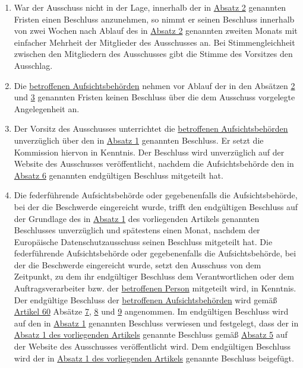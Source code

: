 \begin{enumerate}
  \item War der Ausschuss nicht in der Lage, innerhalb der in \hyperref[itm:65-2]{Absatz 2} genannten Fristen einen
   Beschluss anzunehmen, so nimmt er seinen Beschluss innerhalb von zwei Wochen nach Ablauf des in \hyperref[itm:65-2]
   {Absatz 2} genannten zweiten Monats mit einfacher Mehrheit der Mitglieder des Ausschusses an. Bei Stimmengleichheit
   zwischen den Mitgliedern des Ausschusses gibt die Stimme des Vorsitzes den Ausschlag.
  \label{itm:65-3}

  \item Die \hyperref[itm:04-22]{betroffenen Aufsichtsbehörden} nehmen vor Ablauf der in den Absätzen \hyperref[itm:65-2]{2} und \hyperref
   [itm:65-3]{3} genannten Fristen keinen Beschluss über die dem Ausschuss vorgelegte Angelegenheit an.
  \label{itm:65-4}

  \item Der Vorsitz des Ausschusses unterrichtet die \hyperref[itm:04-22]{betroffenen Aufsichtsbehörden} unverzüglich über den in \hyperref
   [itm:65-1]{Absatz 1} genannten Beschluss. Er setzt die Kommission hiervon in Kenntnis. Der Beschluss wird
   unverzüglich auf der Website des Ausschusses veröffentlicht, nachdem die Aufsichtsbehörde den in \hyperref[itm:65-6]
   {Absatz 6} genannten endgültigen Beschluss mitgeteilt hat.
  \label{itm:65-5}

  \item Die federführende Aufsichtsbehörde oder gegebenenfalls die Aufsichtsbehörde, bei der die Beschwerde eingereicht
   wurde, trifft den endgültigen Beschluss auf der Grundlage des in \hyperref[itm:65-1]{Absatz 1} des vorliegenden
   Artikels genannten Beschlusses unverzüglich und spätestens einen Monat, nachdem der Europäische Datenschutzausschuss
   seinen Beschluss mitgeteilt hat. Die federführende Aufsichtsbehörde oder gegebenenfalls die Aufsichtsbehörde, bei
   der die Beschwerde eingereicht wurde, setzt den Ausschuss von dem Zeitpunkt, zu dem ihr endgültiger Beschluss dem
   Verantwortlichen oder dem Auftragsverarbeiter bzw. der \hyperref[itm:04-1]{betroffenen Person} mitgeteilt wird, in Kenntnis. Der
   endgültige Beschluss der \hyperref[itm:04-22]{betroffenen Aufsichtsbehörden} wird gemäß \hyperref[ch:60]{Artikel 60} Absätze \hyperref
   [itm:60-7]{7}, \hyperref[itm:60-8]{8} und \hyperref[itm:60-9]{9} angenommen. Im endgültigen Beschluss wird auf den
   in \hyperref[itm:65-1]{Absatz 1} genannten Beschluss verwiesen und festgelegt, dass der in \hyperref[itm:65-1]
   {Absatz 1 des vorliegenden Artikels} genannte Beschluss gemäß \hyperref[itm:65-5]{Absatz 5} auf der Website des
   Ausschusses veröffentlicht wird. Dem endgültigen Beschluss wird der in \hyperref[itm:65-1]{Absatz 1 des vorliegenden
   Artikels} genannte Beschluss beigefügt.
  \label{itm:65-6}

\end{enumerate}


